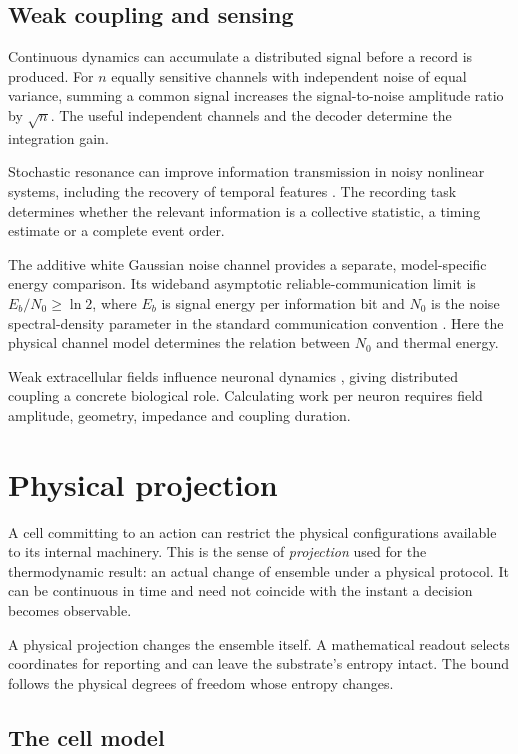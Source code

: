 \documentclass[10pt,a4paper,twocolumn]{article}
\numberwithin{equation}{section}
\begin{document}
\subsection{Weak coupling and sensing}

Continuous dynamics can accumulate a distributed signal before a record is produced. For $n$ equally sensitive channels with independent noise of equal variance, summing a common signal increases the signal-to-noise amplitude ratio by $\sqrt n$. The useful independent channels and the decoder determine the integration gain.

Stochastic resonance can improve information transmission in noisy nonlinear systems, including the recovery of temporal features \cite{stocks2000,mcdonnell2011}. The recording task determines whether the relevant information is a collective statistic, a timing estimate or a complete event order.

The additive white Gaussian noise channel provides a separate, model-specific energy comparison. Its wideband asymptotic reliable-communication limit is $E_b/N_0\geq\ln2$, where $E_b$ is signal energy per information bit and $N_0$ is the noise spectral-density parameter in the standard communication convention \cite{verdu2002}. Here the physical channel model determines the relation between $N_0$ and thermal energy.

Weak extracellular fields influence neuronal dynamics \cite{anastassiou2011}, giving distributed coupling a concrete biological role. Calculating work per neuron requires field amplitude, geometry, impedance and coupling duration.

\section{Physical projection}
\label{sec:projection}

A cell committing to an action can restrict the physical configurations available to its internal machinery. This is the sense of \emph{projection} used for the thermodynamic result: an actual change of ensemble under a physical protocol. It can be continuous in time and need not coincide with the instant a decision becomes observable.

A physical projection changes the ensemble itself. A mathematical readout selects coordinates for reporting and can leave the substrate's entropy intact. The bound follows the physical degrees of freedom whose entropy changes.

\subsection{The cell model}
\end{document}
